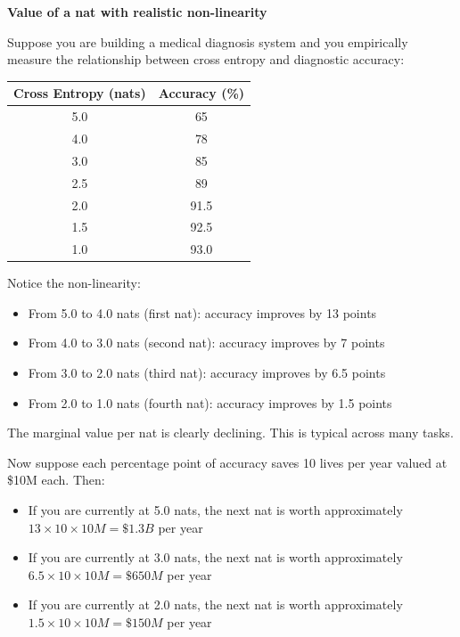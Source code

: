 \vspace{1.5em}

\Needspace{0.75\textheight}
\begin{examplebox}
\textbf{Value of a nat with realistic non-linearity}

\vspace{0.5em}

Suppose you are building a medical diagnosis system and you empirically measure the relationship between cross entropy and diagnostic accuracy:

\vspace{0.5em}

\begin{center}
\begin{tabular}{cc}
Cross Entropy (nats) & Accuracy (\%) \\
\hline
5.0 & 65 \\
4.0 & 78 \\
3.0 & 85 \\
2.5 & 89 \\
2.0 & 91.5 \\
1.5 & 92.5 \\
1.0 & 93.0 \\
\end{tabular}
\end{center}

\vspace{0.5em}

Notice the non-linearity:
\begin{itemize}
\item From 5.0 to 4.0 nats (first nat): accuracy improves by 13 points
\item From 4.0 to 3.0 nats (second nat): accuracy improves by 7 points
\item From 3.0 to 2.0 nats (third nat): accuracy improves by 6.5 points
\item From 2.0 to 1.0 nats (fourth nat): accuracy improves by 1.5 points
\end{itemize}

The marginal value per nat is clearly declining. This is typical across many tasks.

\vspace{0.5em}

Now suppose each percentage point of accuracy saves 10 lives per year valued at \$10M each. Then:

\begin{itemize}
\item If you are currently at 5.0 nats, the next nat is worth approximately $13 \times 10 \times 10M = \$1.3B$ per year
\item If you are currently at 3.0 nats, the next nat is worth approximately $6.5 \times 10 \times 10M = \$650M$ per year
\item If you are currently at 2.0 nats, the next nat is worth approximately $1.5 \times 10 \times 10M = \$150M$ per year
\end{itemize}


\end{examplebox}
